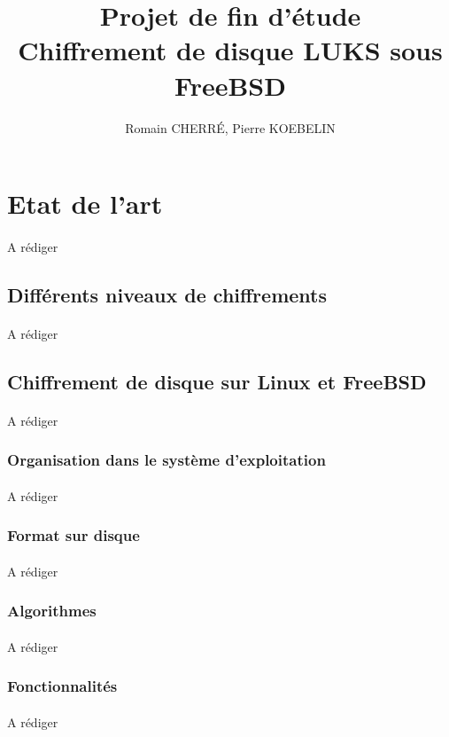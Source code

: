 \documentclass[12pt,a4paper]{report}
\title{Projet de fin d'étude \\ Chiffrement de disque LUKS sous FreeBSD}
\author{Romain CHERRÉ, Pierre KOEBELIN}
\begin{document}
\maketitle

\tableofcontents
\newpage


\section{Etat de l'art}
\paragraph*{} A rédiger
\subsection{Différents niveaux de chiffrements}
\paragraph*{} A rédiger
\subsection{Chiffrement de disque sur Linux et FreeBSD}
\paragraph*{} A rédiger
\subsubsection{Organisation dans le système d'exploitation}
\paragraph*{} A rédiger
\subsubsection{Format sur disque}
\paragraph*{} A rédiger
\subsubsection{Algorithmes}
\paragraph*{} A rédiger
\subsubsection{Fonctionnalités}
\paragraph*{} A rédiger
\end{document}
